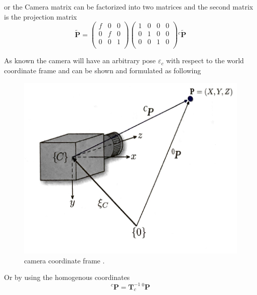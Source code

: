 \documentclass[journal,final,a4paper,twoside]{PS}
\begin{document}
or the Camera matrix can be factorized into two matrices and the second matrix is the projection matrix 
\begin{equation}
\tilde{\textbf{P}} = \begin{pmatrix}
f&0&0\\
0&f&0\\
0&0&1\\
\end{pmatrix}\begin{pmatrix}
1&0&0&0\\
0&1&0&0\\
0&0&1&0\\
\end{pmatrix}{}^{c}\tilde{\textbf{P}}
\end{equation}

As known the camera will have an arbitrary pose $\varepsilon_c$ with respect to the world coordinate frame and can be shown and formulated as following 
\begin{figure}[h]
\begin{center}
\includegraphics[scale=0.3]{./pics/cameraCoordinateFrame.png}
\caption{camera coordinate frame \cite{Corke}.}
\label{fig:cameraFrame}
\end{center}
\end{figure}

Or by using the homogenous coordinates 
\begin{equation}
{}^{c}\textbf{P}=\textbf{T}_c^{-1}\, {}^{0}\textbf{P}
\end{equation}
\end{document}

